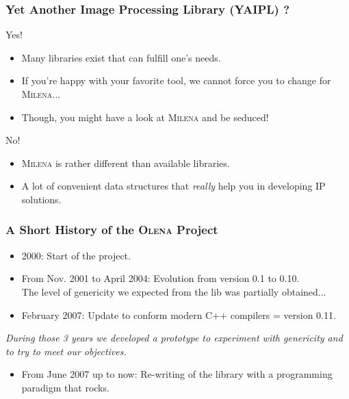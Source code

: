 \documentclass{beamer}
\newcommand{\oln}{\textsc{Olena}\xspace}
\newcommand{\mln}{\textsc{Milena}\xspace}
\begin{document}
\begin{frame}
  \frametitle{Yet Another Image Processing Library (YAIPL) ?}

  \begin{block}{Yes!}
    \begin{itemize}
    \item Many libraries exist that can fulfill one's needs.
    \item If you're happy with your favorite tool, we cannot force you
      to change for \mln...
    \item Though, you might have a look at \mln and be seduced!
    \end{itemize}
    
  \end{block}
 
  \bigskip

  \begin{block}{No!}
    \begin{itemize}
    \item \mln is rather different than available libraries.
    \item A lot of convenient data structures that \emph{really} help
      you in developing IP solutions.
    \end{itemize}
  \end{block}

\end{frame}


\begin{frame}
  \frametitle{A Short History of the \oln Project}

  {\small
    
  \begin{itemize}
  \item 2000: Start of the project.
  \item From Nov. 2001 to April 2004: Evolution from version 0.1 to 0.10.\\
    The level of genericity we expected from the lib was partially obtained...
  \item February 2007: Update to conform modern C++ compilers = version 0.11.\\
  \end{itemize}

  \medskip

  \textit{During those 3 years we developed a prototype to experiment with
    genericity and to try to meet our objectives.}

  \medskip

  \begin{itemize}
  \item From June 2007 up to now: Re-writing of the library with a
    programming paradigm that rocks.
  \end{itemize}

}%

\end{frame}
\end{document}
